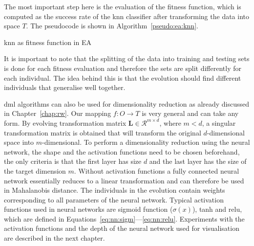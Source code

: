\documentclass[12pt,a4paper]{report}
\begin{document}
The most important step here is the evaluation of the fitness function, which is computed as the success rate of the \ac{knn} classifier after transforming the data into space $T$. The pseudocode is shown in Algorithm~\ref{pseudo:ea:knn}.

\begin{algorithm}[t]
\caption{\ac{knn} as fitness function in EA} \label{pseudo:ea:knn}
\DontPrintSemicolon
\LinesNumbered
{}
\end{algorithm}

It is important to note that the splitting of the data into training and testing sets is done for each fitness evaluation and therefore the sets are split differently for each individual. The idea behind this is that the evolution should find different individuals that generalise well together.

\Ac{dml} algorithms can also be used for dimensionality reduction as already discussed in Chapter~\ref{chap:rw}. Our mapping $f: O \to T$ is very general and can take any form. By evolving transformation matrix $\bm{L} \in \mathcal{R}^{m\times d}$, where $m < d$, a singular transformation matrix is obtained that will transform the original $d$-dimensional space into $m$-dimensional. To perform a dimensionality reduction using the neural network, the shape and the activation functions need to be chosen beforehand, the only criteria is that the first layer has size $d$ and the last layer has the size of the target dimension $m$. Without activation functions a fully connected neural network essentially reduces to a linear transformation and can therefore be used in Mahalanobis distance. The individuals in the evolution contain weights corresponding to all parameters of the neural network. Typical activation functions used in neural networks are sigmoid function ($\sigma(x)$), \ac{tanh} and \ac{relu}, which are defined in Equations~\ref{eq:nn:sigm}---\ref{eq:nn:relu}. Experiments with the activation functions and the depth of the neural network used for visualisation are described in the next chapter.
\end{document}
